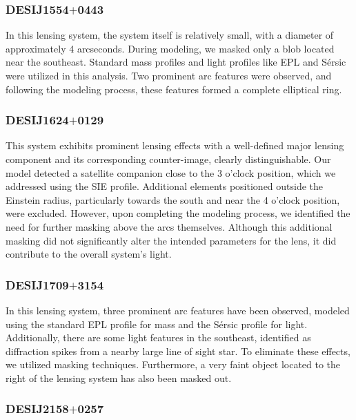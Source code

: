 \documentclass{aa}
\begin{document}
\subsubsection{DESIJ1554$+$0443}

In this lensing system, the system itself is relatively small, with a diameter of approximately 4 arcseconds. During modeling, we masked only a blob located near the southeast. Standard mass profiles and light profiles like EPL and S\'ersic  were utilized in this analysis. Two prominent arc features were observed, and following the modeling process, these features formed a complete elliptical ring.

\subsubsection{DESIJ1624$+$0129}

This system exhibits prominent lensing effects with a well-defined major lensing component and its corresponding counter-image, clearly distinguishable. Our model detected a satellite companion close to the 3 o'clock position, which we addressed using the SIE profile. Additional elements positioned outside the Einstein radius, particularly towards the south and near the 4 o'clock position, were excluded. However, upon completing the modeling process, we identified the need for further masking above the arcs themselves. Although this additional masking did not significantly alter the intended parameters for the lens, it did contribute to the overall system's light.


\subsubsection{DESIJ1709$+$3154}

In this lensing system, three prominent arc features have been observed, modeled using the standard EPL profile for mass and the S\'ersic  profile for light. Additionally, there are some light features in the southeast, identified as diffraction spikes from a nearby large line of sight star. To eliminate these effects, we utilized masking techniques. Furthermore, a very faint object located to the right of the lensing system has also been masked out.

\subsubsection{DESIJ2158$+$0257}
\end{document}
